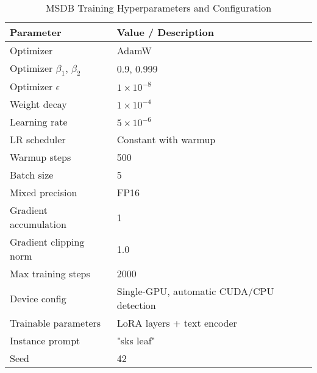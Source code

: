 \begin{table}[htbp]
  \centering
  \caption{MSDB Training Hyperparameters and Configuration}
  \label{tab:msdb-training-hyperparams}
  \renewcommand{\arraystretch}{1.2}
  \setlength{\tabcolsep}{10pt}
  \begin{tabular}{p{5cm} p{7cm}}
    \toprule
    \textbf{Parameter} & \textbf{Value / Description} \\
    \midrule
    Optimizer & AdamW \\
    Optimizer $\beta_1$, $\beta_2$ & 0.9, 0.999 \\
    Optimizer $\epsilon$ & $1 \times 10^{-8}$ \\
    Weight decay & $1 \times 10^{-4}$ \\
    Learning rate & $5 \times 10^{-6}$ \\
    LR scheduler & Constant with warmup \\
    Warmup steps & 500 \\
    Batch size & 5 \\
    Mixed precision & FP16 \\
    Gradient accumulation & 1 \\
    Gradient clipping norm & 1.0 \\
    Max training steps & 2000 \\
    Device config & Single-GPU, automatic CUDA/CPU detection \\
    Trainable parameters & LoRA layers + text encoder \\
    Instance prompt & "sks leaf" \\
    Seed & 42 \\
    \bottomrule
  \end{tabular}
\end{table} 
